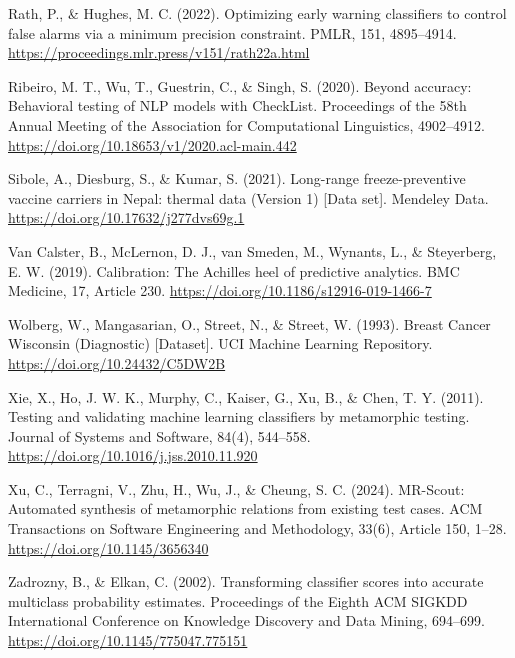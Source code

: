 \documentclass[11pt,a4paper]{article}
\begin{document}
Rath, P., \& Hughes, M. C. (2022). Optimizing early warning classifiers to control false alarms via a minimum precision constraint. PMLR, 151, 4895--4914. \url{https://proceedings.mlr.press/v151/rath22a.html}

Ribeiro, M. T., Wu, T., Guestrin, C., \& Singh, S. (2020). Beyond accuracy: Behavioral testing of NLP models with CheckList. Proceedings of the 58th Annual Meeting of the Association for Computational Linguistics, 4902--4912. \url{https://doi.org/10.18653/v1/2020.acl-main.442}

Sibole, A., Diesburg, S., \& Kumar, S. (2021). Long-range freeze-preventive vaccine carriers in Nepal: thermal data (Version 1) [Data set]. Mendeley Data. \url{https://doi.org/10.17632/j277dvs69g.1}

Van Calster, B., McLernon, D. J., van Smeden, M., Wynants, L., \& Steyerberg, E. W. (2019). Calibration: The Achilles heel of predictive analytics. BMC Medicine, 17, Article 230. \url{https://doi.org/10.1186/s12916-019-1466-7}

Wolberg, W., Mangasarian, O., Street, N., \& Street, W. (1993). Breast Cancer Wisconsin (Diagnostic) [Dataset]. UCI Machine Learning Repository. \url{https://doi.org/10.24432/C5DW2B}

Xie, X., Ho, J. W. K., Murphy, C., Kaiser, G., Xu, B., \& Chen, T. Y. (2011). Testing and validating machine learning classifiers by metamorphic testing. Journal of Systems and Software, 84(4), 544--558. \url{https://doi.org/10.1016/j.jss.2010.11.920}

Xu, C., Terragni, V., Zhu, H., Wu, J., \& Cheung, S. C. (2024). MR-Scout: Automated synthesis of metamorphic relations from existing test cases. ACM Transactions on Software Engineering and Methodology, 33(6), Article 150, 1--28. \url{https://doi.org/10.1145/3656340}

Zadrozny, B., \& Elkan, C. (2002). Transforming classifier scores into accurate multiclass probability estimates. Proceedings of the Eighth ACM SIGKDD International Conference on Knowledge Discovery and Data Mining, 694--699. \url{https://doi.org/10.1145/775047.775151}
\end{document}
